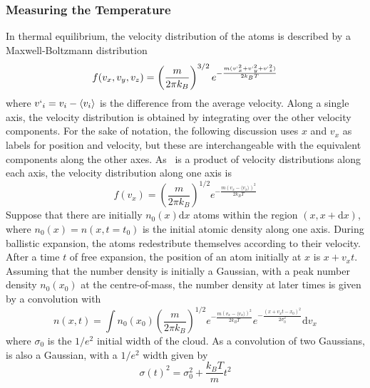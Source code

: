 \subsubsection{Measuring the Temperature}
In thermal equilibrium, the velocity distribution of the atoms is described by a Maxwell-Boltzmann distribution
\begin{equation}
    f(v_x,v_y,v_z) = \left(\frac{m}{2\pi k_B }\right)^{3/2}e^{-\frac{m (v`_x^2+v`_y^2+v`_z^2)}{2 k_B T}}
    \label{eg:mb3D}
\end{equation}
where \(v`_i = v_i - \langle v_i \rangle\) is the difference from the average velocity. Along a single axis, the velocity distribution is obtained by integrating over the other velocity components. For the sake of notation, the following discussion uses \(x\) and \(v_x\) as labels for position and velocity, but these are interchangeable with the equivalent components along the other axes. As~ is a product of velocity distributions along each axis, the velocity distribution along one axis is 
\begin{equation}
    f(v_x) = \left(\frac{m}{2\pi k_B }\right)^{1/2}e^{-\frac{m (v_x-\langle v_x \rangle) ^2}{2 k_B T}}
    \label{eg:mb1D}
\end{equation}
Suppose that there are initially \(n_0 (x) \mathrm{d}x\) atoms within the region \((x, x+\mathrm{d}x)\), where \(n_0(x) = n(x, t=t_0)\) is the initial atomic density along one axis. During ballistic expansion, the atoms redestribute themselves according to their velocity. After a time \(t\) of free expansion, the position of an atom initially at \(x\) is \(x + v_x t\). 
Assuming that the number density is initially a Gaussian, with a peak number density \(n_0(x_0)\) at the centre-of-mass, the number density at later times is given by a convolution with~
\begin{equation}
        n(x,t) = \int n_0(x_0) \left(\frac{m}{2\pi k_B}\right)^{1/2} e^{-\frac{m (v_x-\langle v_x \rangle)^2}{2 k_B T}} e^{-\frac{(x+v_x t - x_0)^2}{2\sigma_0^2}} \mathrm{d}v_x
        \label{eq:density_time}
\end{equation}
where \(\sigma_0\) is the \(1/e^2\) initial width of the cloud. As a convolution of two Gaussians,  is also a Gaussian, with a \(1/e^2\) width given by
\begin{equation}
    \sigma(t)^2 = \sigma_0^2 + \frac{k_B T}{m} t^2
    \label{eq:expansion_width}
\end{equation}
\par\noindent
